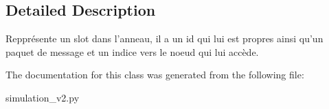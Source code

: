 \subsection{Detailed Description}
\begin{DoxyVerb}    Repprésente un slot dans l'anneau, il a un id qui lui est propres ainsi qu'un paquet de message et un indice vers le noeud qui lui accède.
\end{DoxyVerb}
 

The documentation for this class was generated from the following file\+:\begin{DoxyCompactItemize}
\item 
simulation\+\_\+v2.\+py\end{DoxyCompactItemize}
